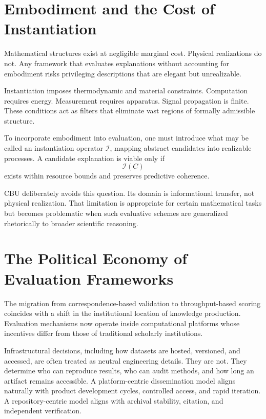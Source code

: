 \documentclass[12pt]{article}
\begin{document}
\section{Embodiment and the Cost of Instantiation}

Mathematical structures exist at negligible marginal cost. Physical realizations do not. Any framework that evaluates explanations without accounting for embodiment risks privileging descriptions that are elegant but unrealizable.

Instantiation imposes thermodynamic and material constraints. Computation requires energy. Measurement requires apparatus. Signal propagation is finite. These conditions act as filters that eliminate vast regions of formally admissible structure.

To incorporate embodiment into evaluation, one must introduce what may be called an instantiation operator \(\mathcal{I}\), mapping abstract candidates into realizable processes. A candidate explanation is viable only if
\[
\mathcal{I}(C)
\]
exists within resource bounds and preserves predictive coherence.

CBU deliberately avoids this question. Its domain is informational transfer, not physical realization. That limitation is appropriate for certain mathematical tasks but becomes problematic when such evaluative schemes are generalized rhetorically to broader scientific reasoning.

\section{The Political Economy of Evaluation Frameworks}

The migration from correspondence-based validation to throughput-based scoring coincides with a shift in the institutional location of knowledge production. Evaluation mechanisms now operate inside computational platforms whose incentives differ from those of traditional scholarly institutions.

Infrastructural decisions, including how datasets are hosted, versioned, and accessed, are often treated as neutral engineering details. They are not. They determine who can reproduce results, who can audit methods, and how long an artifact remains accessible. A platform-centric dissemination model aligns naturally with product development cycles, controlled access, and rapid iteration. A repository-centric model aligns with archival stability, citation, and independent verification.
\end{document}
